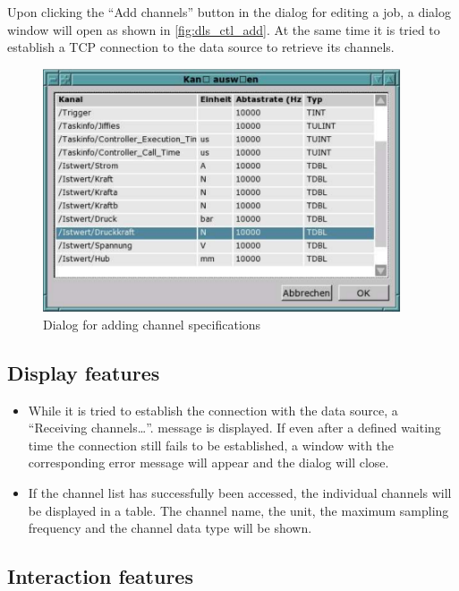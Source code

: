 \documentclass[a4paper,12pt,BCOR6mm,bibtotoc,idxtotoc]{scrbook}
\begin{document}
Upon clicking the ``Add channels'' button in the dialog for editing a job, a
dialog window will open as shown in \autoref{fig:dls_ctl_add}. At the same
time it is tried to establish a TCP connection to the data source to retrieve
its channels.

\begin{figure}[tbh] \begin{center} \includegraphics[width=300pt]{bilder/ctl_add} \end{center} \caption{Dialog for adding channel specifications} \label{fig:dls_ctl_add} \end{figure}


\subsection{Display features}

\begin{itemize}
\item While it is tried to establish the connection with the data source, a ``Receiving channels\ldots''.  message is displayed. If even after a defined waiting time the connection still fails to be established, a window with the corresponding error message will appear and the dialog will close.
\item If the channel list has successfully been accessed, the individual channels will be displayed in a table. The channel name, the unit, the maximum sampling frequency and the channel data type will be shown. \end{itemize}


\subsection{Interaction features}
\end{document}
